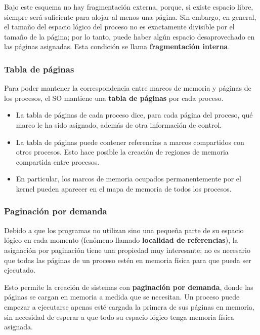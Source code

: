 \documentclass[spanish,A4,]{article}
\begin{document}
Bajo este esquema no hay fragmentación externa, porque, si existe
espacio libre, siempre será suficiente para alojar al menos una página.
Sin embargo, en general, el tamaño del espacio lógico del proceso no es
exactamente divisible por el tamaño de la página; por lo tanto, puede
haber algún espacio desaprovechado en las páginas asignadas. Esta
condición se llama \textbf{fragmentación interna}.

\subsubsection{Tabla de páginas}\label{tabla-de-puxe1ginas}

Para poder mantener la correspondencia entre marcos de memoria y páginas
de los procesos, el SO mantiene una \textbf{tabla de páginas} por cada
proceso.

\begin{itemize}
\item
  La tabla de páginas de cada proceso dice, para cada página del
  proceso, qué marco le ha sido asignado, además de otra información de
  control.
\item
  La tabla de páginas puede contener referencias a marcos compartidos
  con otros procesos. Esto hace posible la creación de regiones de
  memoria compartida entre procesos.
\item
  En particular, los marcos de memoria ocupados permanentemente por el
  kernel pueden aparecer en el mapa de memoria de todos los procesos.
\end{itemize}

\subsubsection{Paginación por demanda}\label{paginaciuxf3n-por-demanda}

Debido a que los programas no utilizan sino una pequeña parte de su
espacio lógico en cada momento (fenómeno llamado \textbf{localidad de
referencias}), la asignación por paginación tiene una propiedad muy
interesante: no es necesario que todas las páginas de un proceso estén
en memoria física para que pueda ser ejecutado.

Esto permite la creación de sistemas con \textbf{paginación por
demanda}, donde las páginas se cargan en memoria a medida que se
necesitan. Un proceso puede empezar a ejecutarse apenas esté cargada la
primera de sus páginas en memoria, sin necesidad de esperar a que todo
su espacio lógico tenga memoria física asignada.
\end{document}
